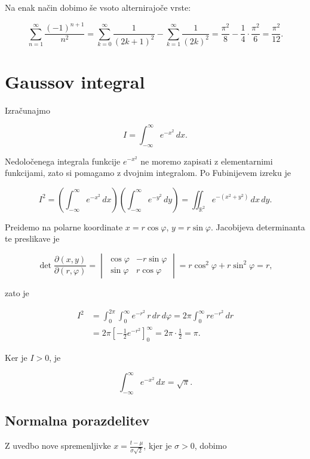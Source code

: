 \documentclass[a4paper]{article}
\begin{document}
Na enak način dobimo še vsoto alternirajoče vrste:

\[\sum_{n=1}^{\infty} \frac{(-1)^{n+1}}{n^2} = \sum_{k=0}^{\infty} \frac{1}{(2k + 1)^2} - \sum_{k=1}^{\infty} \frac{1}{(2k)^2} = \frac{\pi^2}{8} - \frac{1}{4} \cdot \frac{\pi^2}{6} = \frac{\pi^2}{12}.\]

\section{Gaussov integral}\label{gaussov-integral}

Izračunajmo

\[I = \int_{-\infty}^{\infty} e^{-x^2} \, dx.\]

Nedoločenega integrala funkcije \(e^{-x^2}\) ne moremo zapisati z
elementarnimi funkcijami, zato si pomagamo z dvojnim integralom. Po
Fubinijevem izreku je

\[I^2 = \left( \int_{-\infty}^{\infty} e^{-x^2} \, dx \right) \left( \int_{-\infty}^{\infty} e^{-y^2} \, dy \right) = \iint_{\mathbb{R}^2} e^{-(x^2 + y^2)} \, dx \, dy.\]

Preidemo na polarne koordinate \(x = r \cos \varphi\),
\(y = r \sin \varphi\). Jacobijeva determinanta te preslikave je

\[\det \frac{\partial(x, y)}{\partial(r, \varphi)} = \begin{vmatrix} \cos \varphi & -r \sin \varphi \\ \sin \varphi & r \cos \varphi \end{vmatrix} = r \cos^2 \varphi + r \sin^2 \varphi = r,\]

zato je

\[\begin{aligned}
I^2 &= \int_{0}^{2\pi} \int_{0}^{\infty} e^{-r^2} \, r \, dr \, d\varphi
= 2\pi \int_{0}^{\infty} r e^{-r^2} \, dr \\
&= 2\pi \left[ -\frac{1}{2} e^{-r^2} \right]_{0}^{\infty}
= 2\pi \cdot \frac{1}{2}
= \pi.
\end{aligned}\]

Ker je \(I > 0\), je

\[\int_{-\infty}^{\infty} e^{-x^2} \, dx = \sqrt{\pi}.\]

\subsection{Normalna porazdelitev}\label{normalna-porazdelitev}

Z uvedbo nove spremenljivke \(x = \frac{t - \mu}{\sigma \sqrt{2}}\),
kjer je \(\sigma > 0\), dobimo
\end{document}
